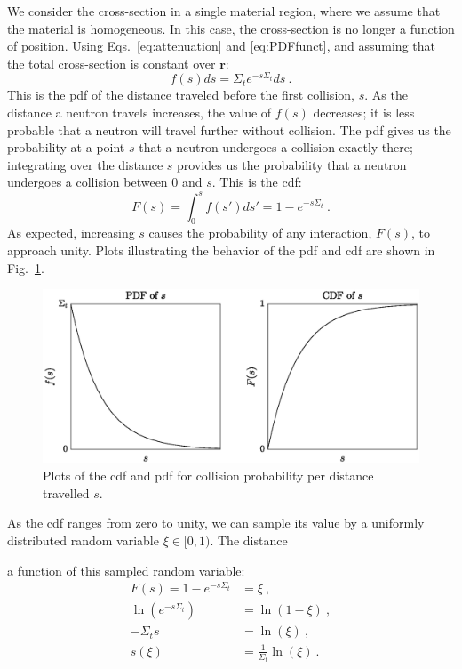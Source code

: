 We consider the cross-section in a single material region, where we
assume that the material is homogeneous. In this case, the
cross-section is no longer a function of position.  Using
Eqs.~\eqref{eq:attenuation} and \eqref{eq:PDFfunct}, and assuming that
the total cross-section is constant over $\mathbf{r}$\cite{lux1991}:
\begin{equation}
  \label{eq:PDF}
  f(s)ds = \Sigma_te^{-s\Sigma_t}ds\:.
\end{equation}
This is the \gls{pdf} of the distance
traveled before the first collision, $s$. As the distance a neutron travels
increases, the value of $f(s)$ decreases; it is less probable that a
neutron will travel further without collision. The \gls{pdf} gives us the
probability at a point $s$ that a neutron undergoes a collision
exactly there; integrating over the distance $s$ provides us the
probability that a neutron undergoes a collision between 0 and $s$. This
is the \gls{cdf}:
\begin{equation}
  \label{eq:cdf}
  F(s) = \int_0^s f(s')ds' = 1-e^{-s\Sigma_t}\:.
\end{equation}
As expected, increasing $s$ causes the probability of any interaction,
$F(s)$, to approach unity. Plots illustrating the behavior of the
\gls{pdf} and \gls{cdf} are shown in Fig.~\ref{fig:cdf_pdf}.
\begin{figure}[hbt]
  \centering
  \includegraphics[scale=0.75]{images/cdf_pdf}
  \caption{Plots of the \acrshort{cdf} and \acrshort{pdf} for collision probability per distance travelled $s$.}
  \label{fig:cdf_pdf}
\end{figure}

As the \gls{cdf} ranges from zero to unity, we can sample its value by
a uniformly distributed random variable $\xi \in [0,1)$. The distance

a function of this sampled random variable:
\begin{align*}
  F(s) = 1 - e^{-s\Sigma_t} &= \xi \:,\\
  \ln(e^{-s \Sigma_t}) &= \ln(1-\xi)\:, \\
  -\Sigma_t s &= \ln(\xi) \:,\\
  s(\xi) &= \frac{1}{\Sigma_t}\ln(\xi)\:.
\end{align*}

